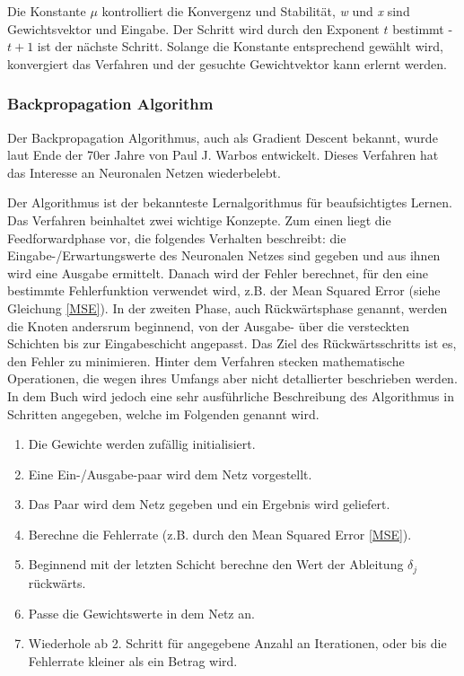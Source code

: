 Die Konstante $\mu$ kontrolliert die Konvergenz und Stabilität, \textit{w} und \textit{x} sind Gewichtsvektor und Eingabe. Der Schritt wird durch den Exponent $t$ bestimmt - $t+1$ ist der nächste Schritt. Solange die Konstante entsprechend gewählt wird, konvergiert das Verfahren und der gesuchte Gewichtvektor kann erlernt werden. \cite{SCTemassi:01}

\subsubsection{Backpropagation Algorithm}
Der Backpropagation Algorithmus, auch als Gradient Descent bekannt, wurde laut \cite{SCTemassi:01} Ende der 70er Jahre von Paul J. Warbos entwickelt. Dieses Verfahren hat das Interesse an Neuronalen Netzen wiederbelebt.

Der Algorithmus ist der bekannteste Lernalgorithmus für beaufsichtigtes Lernen. Das Verfahren beinhaltet zwei wichtige Konzepte. Zum einen liegt die Feedforwardphase vor, die folgendes Verhalten beschreibt: die Eingabe-/Erwartungswerte des Neuronalen Netzes sind gegeben und aus ihnen wird eine Ausgabe ermittelt. Danach wird der Fehler berechnet, für den eine bestimmte Fehlerfunktion verwendet wird, z.B. der Mean Squared Error (siehe Gleichung \ref{MSE}). In der zweiten Phase, auch Rückwärtsphase genannt, werden die Knoten andersrum beginnend, von der Ausgabe- über die versteckten Schichten bis zur Eingabeschicht angepasst. Das Ziel des Rückwärtsschritts ist es, den Fehler zu minimieren. Hinter dem Verfahren stecken mathematische Operationen, die wegen ihres Umfangs aber nicht detallierter beschrieben werden. In dem Buch \cite{SCTemassi:01} wird jedoch eine sehr ausführliche Beschreibung des Algorithmus in Schritten angegeben, welche im Folgenden genannt wird.

\begin{enumerate}\label{BPA}
	\item Die Gewichte werden zufällig initialisiert.
	\item Eine Ein-/Ausgabe-paar wird dem Netz vorgestellt.
	\item Das Paar wird dem Netz gegeben und ein Ergebnis wird geliefert.
	\item Berechne die Fehlerrate (z.B. durch den Mean Squared Error \ref{MSE}).
	\item Beginnend mit der letzten Schicht berechne den Wert der Ableitung $\delta_j$ rückwärts.
	\item Passe die Gewichtswerte in dem Netz an.
	\item Wiederhole ab 2. Schritt für angegebene Anzahl an Iterationen, oder bis die Fehlerrate kleiner als ein Betrag wird.
\end{enumerate}

